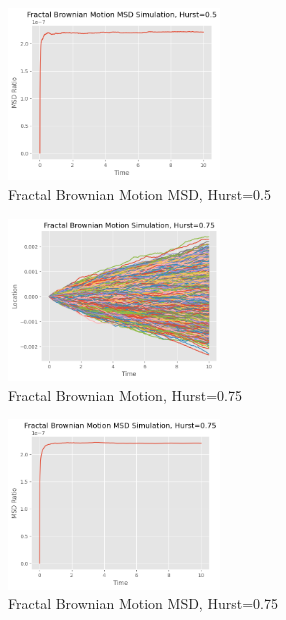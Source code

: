 \documentclass{article}
\begin{document}
\begin{enumerate}
\begin{figure}[h]
\caption{Fractal Brownian Motion MSD, Hurst=0.5}
\centering
\includegraphics[width=0.5\textwidth]{fbm_msd_0.5.png}
\end{figure}
\begin{figure}[h]
\caption{Fractal Brownian Motion, Hurst=0.75}
\centering
\includegraphics[width=0.5\textwidth]{fractal_brownian_motion_simulation_0.75.png}
\end{figure}
\begin{figure}[h]
\caption{Fractal Brownian Motion MSD, Hurst=0.75}
\centering
\includegraphics[width=0.5\textwidth]{fbm_msd_0.75.png}
\end{figure}
\end{enumerate}
\end{document}
